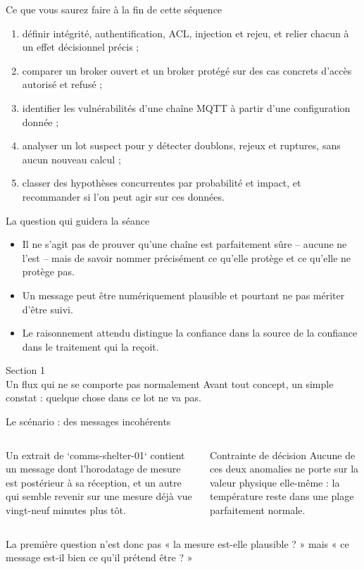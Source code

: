 \documentclass[aspectratio=169]{beamer}
\begin{document}
\begin{frame}{Ce que vous saurez faire à la fin de cette séquence}
  \begin{enumerate}
    \item définir intégrité, authentification, ACL, injection et rejeu, et relier chacun à un effet décisionnel précis ;
    \item comparer un broker ouvert et un broker protégé sur des cas concrets d'accès autorisé et refusé ;
    \item identifier les vulnérabilités d'une chaîne MQTT à partir d'une configuration donnée ;
    \item analyser un lot suspect pour y détecter doublons, rejeux et ruptures, sans aucun nouveau calcul ;
    \item classer des hypothèses concurrentes par probabilité et impact, et recommander si l'on peut agir sur ces données.
  \end{enumerate}
\end{frame}

\begin{frame}{La question qui guidera la séance}
  \begin{itemize}
    \item Il ne s'agit pas de prouver qu'une chaîne est parfaitement sûre -- aucune ne l'est -- mais de savoir nommer précisément ce qu'elle protège et ce qu'elle ne protège pas.
    \item Un message peut être numériquement plausible et pourtant ne pas mériter d'être suivi.
    \item Le raisonnement attendu distingue la confiance dans la source de la confiance dans le traitement qui la reçoit.
  \end{itemize}
\end{frame}

\begin{frame}[plain]
  \centering
  \Huge Section 1\\[3mm]
  \Large Un flux qui ne se comporte pas normalement
  \vfill
  \normalsize Avant tout concept, un simple constat : quelque chose dans ce lot ne va pas.
\end{frame}

\begin{frame}{Le scénario : des messages incohérents}
  \begin{columns}[T]
    Un extrait de `comms-shelter-01` contient un message dont l'horodatage de mesure est postérieur à sa réception, et un autre qui semble revenir sur une mesure déjà vue vingt-neuf minutes plus tôt.
    \begin{block}{Contrainte de décision}
      Aucune de ces deux anomalies ne porte sur la valeur physique elle-même : la température reste dans une plage parfaitement normale.
    \end{block}
  \end{columns}
  \vfill
  \alert{La première question n'est donc pas « la mesure est-elle plausible ? » mais « ce message est-il bien ce qu'il prétend être ? »}
\end{frame}
\end{document}
